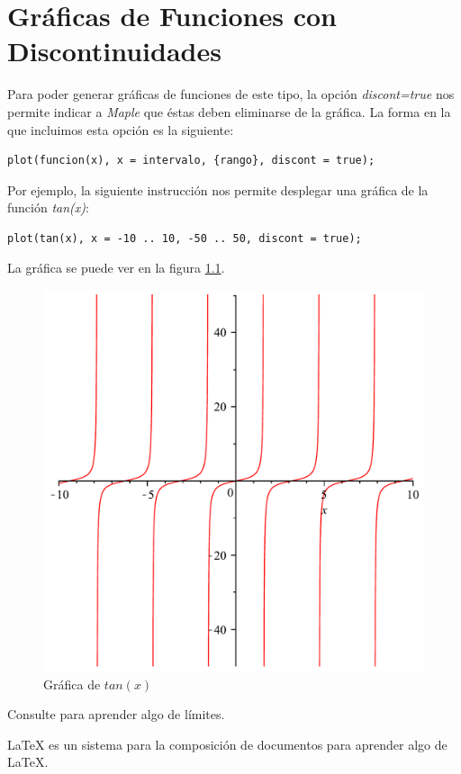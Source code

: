 
\chapter{Gráficas de Funciones con Discontinuidades}

\begin{bibunit}[plain]

Para poder generar gráficas de funciones de este tipo, la opción
\emph{discont=true} nos permite indicar a \emph{Maple} que éstas deben eliminarse de la
gráfica. La forma en la que incluimos esta opción es la siguiente:

\begin{verbatim}
plot(funcion(x), x = intervalo, {rango}, discont = true);
\end{verbatim}

Por ejemplo, la siguiente instrucción nos permite desplegar una gráfica de la 
función \emph{tan(x)}:

\begin{verbatim}
plot(tan(x), x = -10 .. 10, -50 .. 50, discont = true);
\end{verbatim}

La gráfica se puede ver en la figura \ref{cap2f1}.

\begin{figure}[h!]
\centering
\includegraphics[scale=0.4]{grafica04}
\caption{Gráfica de $tan (x)$}\label{cap2f1}
\end{figure}

Consulte \cite[cap. 2]{spivakCalc} para aprender algo de límites.

\LaTeX{} es un sistema para la composición de documentos \cite[cap. ~2]{Lamport} para aprender algo de \LaTeX{}.

\putbib[mibiblio]

\end{bibunit}

